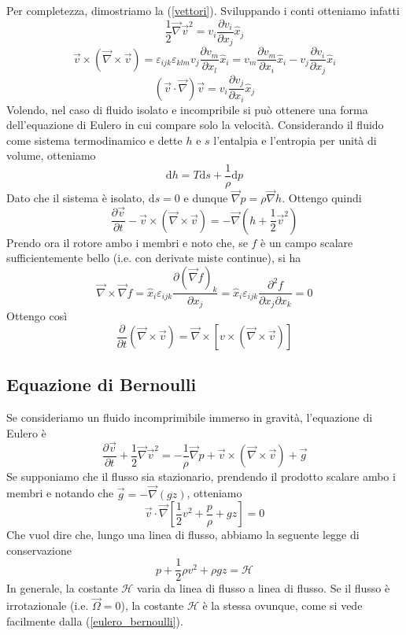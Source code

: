 \documentclass[a4paper,11pt]{article}
\begin{document}
\noindent Per completezza, dimostriamo la (\ref{vettori}). Sviluppando i conti otteniamo infatti
\[\frac{1}{2}\vec{\nabla}\vec v^2=v_i\frac{\partial v_i}{\partial x_j}\hat{x}_j\]
\[\vec v\times(\vec{\nabla}\times\vec v)=\varepsilon_{ijk}\varepsilon_{klm}v_j\frac{\partial v_m}{\partial x_l}\hat{x}_i=v_m\frac{\partial v_m}{\partial x_i}\hat{x}_i-v_j\frac{\partial v_i}{\partial x_j}\hat{x}_i\]
\[(\vec v\cdot\vec \nabla)\vec v=v_i\frac{\partial v_j}{\partial x_i}\hat{x}_j\]
Volendo, nel caso di fluido isolato e incompribile si può ottenere una forma dell'equazione di Eulero in cui compare solo la velocità.
Considerando il fluido come sistema termodinamico e dette $h$ e $s$ l'entalpia e l'entropia per unità di volume, otteniamo
\[\mathrm{d}h=T\mathrm{d}s+\frac{1}{\rho}\mathrm{d}p\]
Dato che il sistema è isolato, $\mathrm{d}s=0$ e dunque $\vec{\nabla}p=\rho\vec{\nabla}h$. Ottengo quindi
\[\frac{\partial \vec{v}}{\partial t}-\vec{v}\times\left(\vec{\nabla}\times\vec{v}\right)=-\vec{\nabla}\left(h+\frac{1}{2}\vec{v}^2\right)\]
Prendo ora il rotore ambo i membri e noto che, se $f$ è un campo scalare sufficientemente bello (i.e. con derivate miste continue), si ha \[\vec{\nabla}\times\vec{\nabla}f=\hat{x}_i\varepsilon_{ijk}\frac{\partial\left(\vec{\nabla}f\right)_k}{\partial x_j}=\hat{x}_i\varepsilon_{ijk}\frac{\partial^2f}{\partial x_j\partial x_k}=0\]
Ottengo così
\[\frac{\partial}{\partial t}\left(\vec{\nabla}\times\vec{v}\right)=\vec{\nabla}\times\left[v\times\left(\vec{\nabla}\times\vec{v}\right)\right]\]

\subsection{Equazione di Bernoulli}
Se consideriamo un fluido incomprimibile immerso in gravità, l'equazione di Eulero è 
\begin{equation}\frac{\partial \vec{v}}{\partial t}+\frac{1}{2}\vec{\nabla}\vec{v}^2=-\frac{1}{\rho}\vec{\nabla}p+\vec{v}\times\left(\vec{\nabla}\times\vec{v}\right)+\vec{g}
\label{eulero_bernoulli}\end{equation}
Se supponiamo che il flusso sia stazionario, prendendo il prodotto scalare ambo i membri e notando che $\vec{g}=-\vec{\nabla}\left(gz\right)$, otteniamo
\[\vec{v}\cdot\vec{\nabla}\left[\frac{1}{2}v^2+\frac{p}{\rho}+gz\right]=0\]
Che vuol dire che, lungo una linea di flusso, abbiamo la seguente legge di conservazione
\[p+\frac{1}{2}\rho v^2+\rho gz=\mathcal{H}\]
In generale, la costante $\mathcal{H}$ varia da linea di flusso a linea di flusso. Se il flusso è irrotazionale (i.e. $\vec \Omega=0$), la costante $\mathcal{H}$ è la stessa ovunque, come si vede facilmente dalla (\ref{eulero_bernoulli}).
\end{document}

